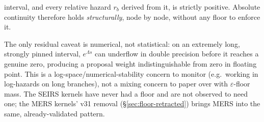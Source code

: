 \documentclass[11pt]{article}
\theoremstyle{plain}
\begin{document}
\begin{enumerate}
\begin{itemize}
interval, and every relative hazard $r_b$ derived from it, is strictly positive. Absolute continuity
therefore holds \emph{structurally}, node by node, without any floor to enforce it.
\end{itemize}
The only residual caveat is numerical, not statistical: on an extremely long, strongly pinned
interval, $e^{\Lambda s}$ can underflow in double precision before it reaches a genuine zero,
producing a proposal weight indistinguishable from zero in floating point. This is a
log-space/numerical-stability concern to monitor (e.g.\ working in log-hazards on long branches),
not a mixing concern to paper over with $\varepsilon$-floor mass. The SEIRS kernels have never had
a floor and are not observed to need one; the MERS kernels' v31 removal (\S\ref{sec:floor-retracted})
brings MERS into the same, already-validated pattern.


\end{enumerate}
\end{document}
